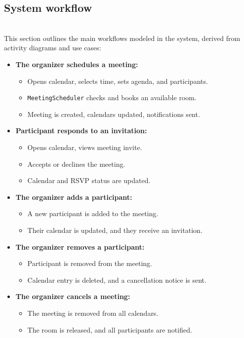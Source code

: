 \subsection{System workflow}\label{fYcYmXLzcf3TcnDEMNOu9}
\\
This section outlines the main workflows modeled in the system, derived from activity diagrams and use cases:

\begin{itemize}
\item
\protect{}\label{oltuSICAsnrxemLEc-iTQ}
\textbf{The organizer schedules a meeting:}

\begin{itemize}
\item
Opens calendar, selects time, sets agenda, and participants.
\item
\texttt{MeetingScheduler} checks and books an available room.
\item
Meeting is created, calendars updated, notifications sent.
\end{itemize}
\item
\protect{}\label{-LWUxXtDVtfg2sZUAUeZq}
\textbf{Participant responds to an invitation:}

\begin{itemize}
\item
Opens calendar, views meeting invite.
\item
Accepts or declines the meeting.
\item
Calendar and RSVP status are updated.
\end{itemize}
\item
\protect{}\label{Fh5YPi_eKZtqL_fT7bnpG}
\textbf{The organizer adds a participant:}

\begin{itemize}
\item
A new participant is added to the meeting.
\item
Their calendar is updated, and they receive an invitation.
\end{itemize}
\item
\protect{}\label{QCmKhba1sjW7EBEwz5Tz6}
\textbf{The organizer removes a participant:}

\begin{itemize}
\item
Participant is removed from the meeting.
\item
Calendar entry is deleted, and a cancellation notice is sent.
\end{itemize}
\item
\protect{}\label{3t2ybQuQ7utyI0b7MIHcL}
\textbf{The organizer cancels a meeting:}

\begin{itemize}
\item
The meeting is removed from all calendars.
\item
The room is released, and all participants are notified.
\end{itemize}
\end{itemize}

